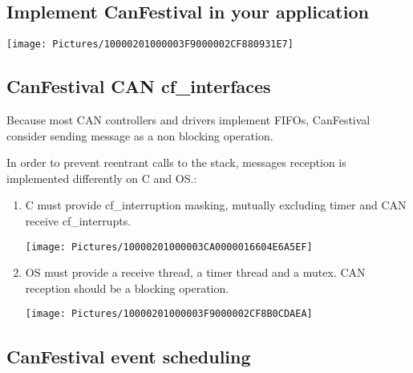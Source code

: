 \documentclass[12pt,english,a4paper]{book}
\begin{document}
\subsection{Implement CanFestival in your application}

\begin{center}
\texttt{[image: Pictures/10000201000003F9000002CF880931E7]} 
\par\end{center}

\bigskip{}



\subsection{CanFestival CAN cf_interfaces}

Because most CAN controllers and drivers implement FIFOs, CanFestival
consider sending message as a non blocking operation.

In order to prevent reentrant calls to the stack, messages reception
is implemented differently on {\textmu}C and OS.:

\begin{enumerate}
\item {\textmu}C must provide cf_interruption masking, mutually excluding timer and CAN receive cf_interrupts.\\



\begin{center}
\texttt{[image: Pictures/10000201000003CA0000016604E6A5EF]} 
\par\end{center}

\item OS must provide a receive thread, a timer thread and a mutex. CAN
reception should be a blocking operation.\\



\begin{center}
\texttt{[image: Pictures/10000201000003F9000002CF8B0CDAEA]} 
\par\end{center}

\end{enumerate}

\subsection{CanFestival event scheduling}
\end{document}
